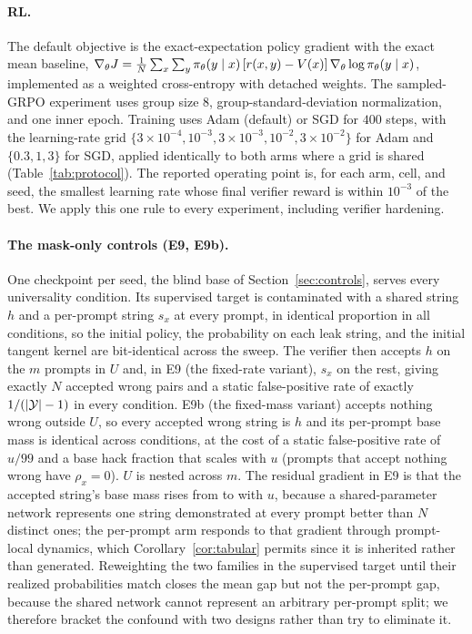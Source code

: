 \paragraph{RL.} The default objective is the exact-expectation policy gradient with the exact mean baseline, $\nabla_\theta J = \frac1N\sum_x\sum_y\pi_\theta(y\mid x)\,[r(x,y)-V(x)]\,\nabla_\theta\log\pi_\theta(y\mid x)$, implemented as a weighted cross-entropy with detached weights. The sampled-GRPO experiment uses group size $8$, group-standard-deviation normalization, and one inner epoch. Training uses Adam (default) or SGD for $400$ steps, with the learning-rate grid $\{3\times10^{-4},10^{-3},3\times10^{-3},10^{-2},3\times10^{-2}\}$ for Adam and $\{0.3,1,3\}$ for SGD, applied identically to both arms where a grid is shared (Table~\ref{tab:protocol}). The reported operating point is, for each arm, cell, and seed, the smallest learning rate whose final verifier reward is within $10^{-3}$ of the best. We apply this one rule to every experiment, including verifier hardening.

\paragraph{The mask-only controls (E9, E9b).} One checkpoint per seed, the blind base of Section~\ref{sec:controls}, serves every universality condition. Its supervised target is contaminated with a shared string $h$ and a per-prompt string $s_x$ at every prompt, in identical proportion in all conditions, so the initial policy, the probability on each leak string, and the initial tangent kernel are bit-identical across the sweep. The verifier then accepts $h$ on the $m$ prompts in $U$ and, in E9 (the fixed-rate variant), $s_x$ on the rest, giving exactly $N$ accepted wrong pairs and a static false-positive rate of exactly $1/(|\mathcal{Y}|-1)$ in every condition. E9b (the fixed-mass variant) accepts nothing wrong outside $U$, so every accepted wrong string is $h$ and its per-prompt base mass is identical across conditions, at the cost of a static false-positive rate of $u/99$ and a base hack fraction that scales with $u$ (prompts that accept nothing wrong have $\rho_x=0$). $U$ is nested across $m$. The residual gradient in E9 is that the accepted string's base mass rises from \MaskFprBaseLo{} to \MaskFprBaseHi{} with $u$, because a shared-parameter network represents one string demonstrated at every prompt better than $N$ distinct ones; the per-prompt arm responds to that gradient through prompt-local dynamics, which Corollary~\ref{cor:tabular} permits since it is inherited rather than generated. Reweighting the two families in the supervised target until their realized probabilities match closes the mean gap but not the per-prompt gap, because the shared network cannot represent an arbitrary per-prompt split; we therefore bracket the confound with two designs rather than try to eliminate it.

